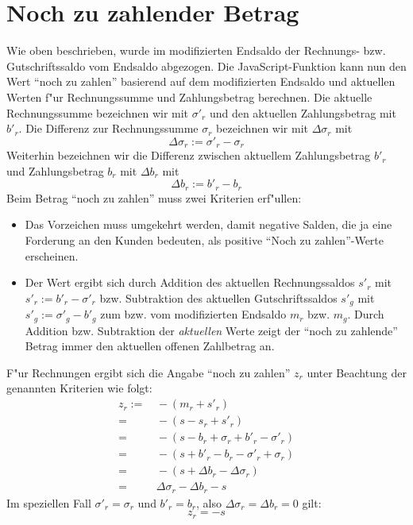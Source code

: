 \documentclass[a4paper]{article}
\numberwithin{equation}{section}
\begin{document}
\section{Noch zu zahlender Betrag}\label{sec:stillUnpaid}
Wie oben beschrieben, wurde im modifizierten Endsaldo der Rechnungs- bzw. 
Gutschriftssaldo vom Endsaldo abgezogen. Die JavaScript-Funktion kann nun den 
Wert "`noch zu zahlen"' basierend auf dem modifizierten Endsaldo und aktuellen 
Werten f"ur Rechnungssumme und Zahlungsbetrag berechnen. Die aktuelle 
Rechnungssumme bezeichnen wir mit $\sigma'_r$ und den aktuellen Zahlungsbetrag 
mit $b'_r$. Die Differenz zur Rechnungssumme $\sigma_r$ bezeichnen wir mit 
$\Delta\sigma_r$ mit
\begin{equation}\Delta\sigma_r := \sigma'_r - \sigma_r\end{equation}
Weiterhin bezeichnen wir die Differenz zwischen aktuellem Zahlungsbetrag $b'_r$
und Zahlungsbetrag $b_r$ mit $\Delta b_r$ mit
\begin{equation}\Delta b_r := b'_r - b_r\end{equation}
Beim Betrag "`noch zu zahlen"' muss zwei Kriterien erf"ullen:
\begin{itemize}
  \item Das Vorzeichen muss umgekehrt werden, damit negative Salden, die ja 
    eine Forderung an den Kunden bedeuten, als positive "`Noch zu zahlen"'-Werte
    erscheinen.
  \item Der Wert ergibt sich durch Addition des aktuellen Rechnungssaldos $s'_r$
    mit $s'_r := b'_r - \sigma'_r$ bzw. Subtraktion des aktuellen 
    Gutschriftssaldos $s'_g$ mit $s'_g := \sigma'_g - b'_g$ zum bzw. vom
    modifizierten Endsaldo $m_r$ bzw. $m_g$. Durch Addition bzw. Subtraktion der
    \emph{aktuellen} Werte zeigt der "`noch zu zahlende"' Betrag immer den 
    aktuellen offenen Zahlbetrag an.
\end{itemize}

\noindent F"ur Rechnungen ergibt sich die Angabe "`noch zu zahlen"' $z_r$ unter
Beachtung der genannten Kriterien wie folgt:
\begin{equation}
\begin{split}
  z_r := & \,-(m_r + s'_r) \\
    = & \,-(s - s_r + s'_r) \\
    = & \,-(s - b_r + \sigma_r + b'_r - \sigma'_r) \\
    = & \,-(s + b'_r - b_r - \sigma'_r + \sigma_r) \\
    = & \,-(s + \Delta b_r - \Delta\sigma_r) \\
    = & \,\Delta\sigma_r - \Delta b_r - s
\end{split}
\end{equation}
Im speziellen Fall $\sigma'_r = \sigma_r$ und $b'_r = b_r$, also 
$\Delta\sigma_r = \Delta b_r = 0$ gilt:
\begin{equation}z_r = -s\end{equation}
\end{document}
